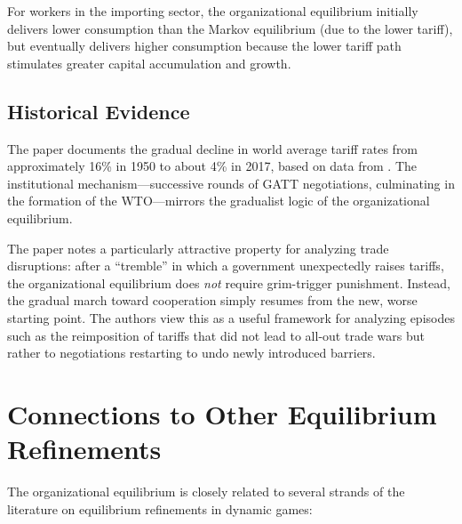 \documentclass[12pt]{article}
\begin{document}
For workers in the importing sector, the organizational equilibrium initially
delivers lower consumption than the Markov equilibrium (due to the lower tariff),
but eventually delivers higher consumption because the lower tariff path
stimulates greater capital accumulation and growth.

\subsection{Historical Evidence}

The paper documents the gradual decline in world average tariff rates from
approximately 16\% in 1950 to about 4\% in 2017, based on data from
\citet{antras2020}.  The institutional mechanism---successive rounds of GATT
negotiations, culminating in the formation of the WTO---mirrors the gradualist
logic of the organizational equilibrium.

The paper notes a particularly attractive property for analyzing trade
disruptions:  after a ``tremble'' in which a government unexpectedly raises
tariffs, the organizational equilibrium does \emph{not} require grim-trigger
punishment.  Instead, the gradual march toward cooperation simply resumes from
the new, worse starting point.  The authors view this as a useful framework for
analyzing episodes such as the reimposition of tariffs that did not lead to
all-out trade wars but rather to negotiations restarting to undo newly introduced
barriers.


\section{Connections to Other Equilibrium Refinements}

The organizational equilibrium is closely related to several strands of the
literature on equilibrium refinements in dynamic games:
\end{document}
